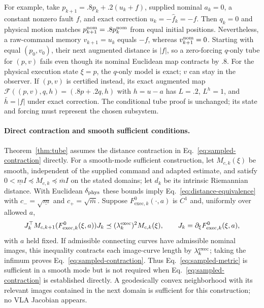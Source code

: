 For example, take $p_{k+1}=.8p_k+.2(u_k+f)$, supplied nominal $a_k=0$, a
constant nonzero fault $f$, and exact correction $u_k=-\widehat f_k=-f$.
Then $q_k=0$ and physical motion matches $p_{k+1}^{\rm nom}=.8p_k^{\rm nom}$ from equal
initial positions. Nevertheless, a raw-command memory $v_{k+1}=u_k$ equals
$-f$, whereas $v_{k+1}^{\rm nom}=0$. Starting with equal $(p_0,v_0)$, their next
augmented distance is $|f|$, so a zero-forcing $q$-only tube for $(p,v)$
fails even though its nominal Euclidean map contracts by $.8$. For the
physical execution state $\xi=p$, the $q$-only model is exact; $v$ can stay
in the observer. If $(p,v)$ is certified instead, its exact augmented map
$\mathcal F((p,v),q,h)=(.8p+.2q,h)$ with $h=u-a$ has $L=.2$, $L^h=1$,
and $\bar h=|f|$ under exact correction. The conditional tube proof is
unchanged; its state and forcing must represent the chosen subsystem.

\paragraph{Direct contraction and smooth sufficient conditions.}
Theorem~\ref{thm:tube} assumes the distance contraction in
Eq.~\eqref{eq:sampled-contraction} directly. For a smooth-mode sufficient
construction, let $M_{c,k}(\xi)$ be smooth, independent of the supplied
command and adapted estimate, and satisfy
$0<\underline m I\preceq M_{c,k}\preceq\overline m I$ on the stated domains;
let $d_k$ be its intrinsic Riemannian distance. With Euclidean
$\delta_{\rm phys}$ these bounds imply Eq.~\eqref{eq:distance-equivalence}
with $c_-=\sqrt{\underline m}$ and $c_+=\sqrt{\overline m}$. Suppose
$F_{\mathrm{exec},k}^0(\cdot,a)$ is $C^1$ and, uniformly over allowed $a$,
\begin{equation}
J_k^\top M_{c,k+1}(F_{\mathrm{exec},k}^0(\xi,a))J_k
\preceq(\lambda_k^{\rm exec})^2M_{c,k}(\xi),\qquad
J_k=\partial_\xi F_{\mathrm{exec},k}^0(\xi,a),
\label{eq:sampled-metric}
\end{equation}
with $a$ held fixed. If admissible connecting curves have admissible nominal
images, this inequality contracts each image-curve length by
$\lambda_k^{\rm exec}$; taking the infimum proves
Eq.~\eqref{eq:sampled-contraction}. Thus Eq.~\eqref{eq:sampled-metric} is
sufficient in a smooth mode but is not required when
Eq.~\eqref{eq:sampled-contraction} is established directly. A geodesically
convex neighborhood with its relevant images contained in the next domain is
sufficient for this construction; no VLA Jacobian appears.

